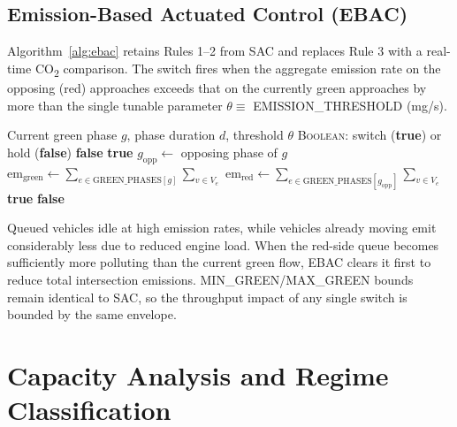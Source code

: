 \documentclass[review,3p,authoryear,times]{elsarticle}
\begin{document}
\subsection{Emission-Based Actuated Control (EBAC)}

Algorithm~\ref{alg:ebac} retains Rules 1--2 from SAC and replaces Rule 3
with a real-time CO\textsubscript{2} comparison. The switch fires when the
aggregate emission rate on the opposing (red) approaches exceeds that on the
currently green approaches by more than the single tunable parameter
$\theta \equiv$ EMISSION\_THRESHOLD (mg/s).

\begin{algorithm}[H]
\caption{Emission-Based Actuated Control (EBAC) — switch decision}
\label{alg:ebac}
\begin{algorithmic}[1]
\Require Current green phase $g$, phase duration $d$, threshold $\theta$
\Ensure \textsc{Boolean}: switch (\textbf{true}) or hold (\textbf{false})
 \Return \textbf{false}
\EndIf
{} \Return \textbf{true}
\EndIf
\State $g_{\text{opp}} \gets $ opposing phase of $g$ 
\State $\text{em}_{\text{green}} \gets \sum_{e \in \text{GREEN\_PHASES}[g]} \sum_{v \in V_e} $ 
\State $\text{em}_{\text{red}}   \gets \sum_{e \in \text{GREEN\_PHASES}[g_{\text{opp}}]} \sum_{v \in V_e} $ 
  \State \Return \textbf{true} 
\EndIf
\State \Return \textbf{false} 
\end{algorithmic}
\end{algorithm}

Queued vehicles idle at high emission rates, while vehicles already moving
emit considerably less due to reduced engine load. When the red-side queue
becomes sufficiently more polluting than the current green flow, EBAC clears
it first to reduce total intersection emissions. MIN\_GREEN/MAX\_GREEN bounds
remain identical to SAC, so the throughput impact of any single switch is
bounded by the same envelope.

\section{Capacity Analysis and Regime Classification}
\label{sec:capacity}
\end{document}
